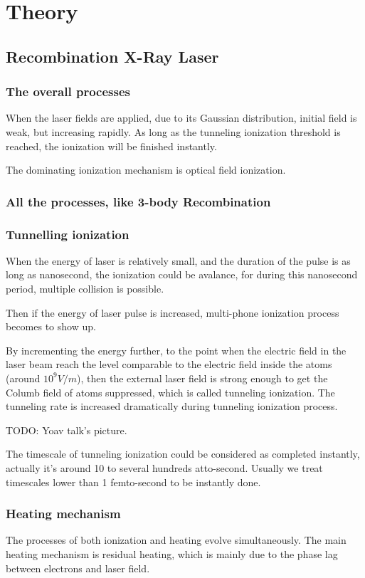 \chapter{Theory\label{ch:theory}}
\section{Recombination X-Ray Laser}
\subsection{The overall processes}
When the laser fields are applied, due to its Gaussian distribution,
initial field is weak, but increasing rapidly. As long as the
tunneling ionization threshold is reached, the ionization will be
finished instantly.

The dominating ionization mechanism is optical field ionization.
\subsection{All the processes, like 3-body Recombination}
\subsection{Tunnelling ionization}
When the energy of laser is relatively small, and the duration of the
pulse is as long as nanosecond, the ionization could be avalance, for
during this nanosecond period, multiple collision is possible.

Then if the energy of laser pulse is increased, multi-phone ionization
process becomes to show up.

By incrementing the energy further, to the point when the electric
field in the laser beam reach the level comparable to the electric
field inside the atoms (around $10^9 V/m$), then the external laser
field is strong enough to get the Columb field of atoms suppressed,
which is called tunneling ionization. The tunneling rate is increased
dramatically during tunneling ionization process.

TODO: Yoav talk's picture.

The timescale of tunneling ionization could be considered as completed
instantly, actually it's around 10 to several hundreds
atto-second. Usually we treat timescales lower than 1 femto-second to
be instantly done.
\subsection{Heating mechanism}
The processes of both ionization and heating evolve
simultaneously. The main heating mechanism is residual heating, which
is mainly due to the phase lag between electrons and laser field.


